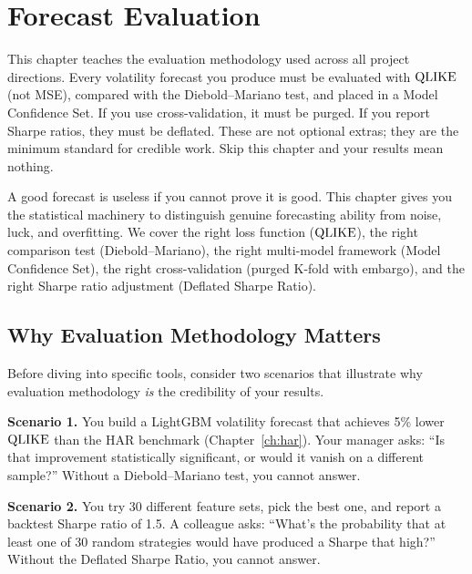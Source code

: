 \chapter{Forecast Evaluation}
\label{ch:evaluation}

\begin{application}
This chapter teaches the evaluation methodology used across all project directions.
Every volatility forecast you produce must be evaluated with $\operatorname{QLIKE}$ (not MSE),
compared with the Diebold--Mariano test, and placed in a Model Confidence Set.
If you use cross-validation, it must be purged.
If you report Sharpe ratios, they must be deflated.
These are not optional extras; they are the minimum standard for credible work.
Skip this chapter and your results mean nothing.
\end{application}

A good forecast is useless if you cannot prove it is good.
This chapter gives you the statistical machinery to distinguish genuine forecasting ability from noise, luck, and overfitting.
We cover the right loss function ($\operatorname{QLIKE}$), the right comparison test (Diebold--Mariano), the right multi-model framework (Model Confidence Set), the right cross-validation (purged K-fold with embargo), and the right Sharpe ratio adjustment (Deflated Sharpe Ratio).


\section{Why Evaluation Methodology Matters}
\label{sec:eval-why}

Before diving into specific tools, consider two scenarios that illustrate why evaluation methodology \emph{is} the credibility of your results.

\textbf{Scenario 1.}
You build a LightGBM volatility forecast that achieves 5\% lower $\operatorname{QLIKE}$ than the HAR benchmark (Chapter~\ref{ch:har}).
Your manager asks: ``Is that improvement statistically significant, or would it vanish on a different sample?''
Without a Diebold--Mariano test, you cannot answer.

\textbf{Scenario 2.}
You try 30 different feature sets, pick the best one, and report a backtest Sharpe ratio of 1.5.
A colleague asks: ``What's the probability that at least one of 30 random strategies would have produced a Sharpe that high?''
Without the Deflated Sharpe Ratio, you cannot answer.

